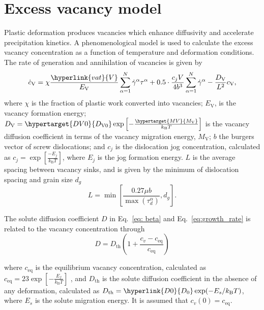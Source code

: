 \documentclass[11pt]{scrartcl}
\newcommand{\eref}[1]{Eq.~\eqref{#1}}
\newcommand{\kB}{\ensuremath{k_\text{B}}}
\begin{document}
\section{Excess vacancy model}
Plastic deformation produces vacancies which enhance diffusivity and accelerate precipitation kinetics. A phenomenological model \cite{Robson2020, Militzer1994, Bignon2022} is used to calculate the excess vacancy concentration as a function of temperature and deformation conditions. The rate of generation and annihilation of vacancies is given by
%
\begin{equation}
\label{eq: vacancyrate}
\dot{c}_\text{V} = \chi \frac{\hyperlink{vat}{V}}{E_\text{V}} \sum_{\alpha = 1}^{N} \dot{\gamma}^{\alpha} \tau^{\alpha}  + 0.5\cdot\frac{c_{j}V}{4b^{3}}  \sum_{\alpha = 1}^{N} \dot{\gamma}^{\alpha}   - \frac{D_\text{V}}{L^2} c_\text{V},
\end{equation} 
where \hypertarget{generation}{$\chi$} is the fraction of plastic work converted into vacancies;  \hypertarget{EV}{$E_\text{V}$}, is the vacancy formation energy; $D_\text{V} = \hypertarget{DV0}{D_\text{V0}} \exp\left[-\frac{\hypertarget{MV}{M_\text{V}}}{\kB T}\right]$ is the vacancy diffusion coefficient in terms of the vacancy migration energy, $M_\text{V}$; \hypertarget{b}{$b$} the burgers vector of screw dislocations; and $c_{j}$ is the dislocation jog concentration, calculated as $c_j=\exp\left[\frac{-E_j}{\kB T}\right]$, where \hypertarget{Ej}{$E_j$} is the jog formation energy.
$L$ is the average spacing between vacancy sinks, and is given by the minimum of dislocation spacing and grain size \hyperlink{dg}{$d_{g}$}
%
\begin{equation}
\label{eq: vacancysink}
L = \min\left[\frac{0.27 \mu b}{\max(\tau_d^{\alpha}) }, d_g\right].
\end{equation} 
%

The solute diffusion coefficient $D$ in \eref{eq: beta} and \eref{eq:growth_rate} is related to the vacancy concentration through
%
\begin{equation}
\label{eq: diffusion}
D = D_{\text{th}}(1+\frac{c_v-c{_\text{eq}}}{c_{\text{eq}}})
\end{equation} 

where $c{_\text{eq}}$ is the equilibrium vacancy concentration, calculated as $c{_\text{eq}}=23\exp[-\frac{E_f}{\kB T}]$ \cite{Bignon2022}, and $D_{\text{th}}$ is the solute diffusion coefficient in the absence of any deformation, calculated as $D_{\text{th}}=\hyperlink{D0}{D_0}\exp(-E_s/\kB T)$, where \hyperlink{Es}{$E_s$} is the solute migration energy. It is assumed that $c_v(0)=c{_\text{eq}}$.
\end{document}
